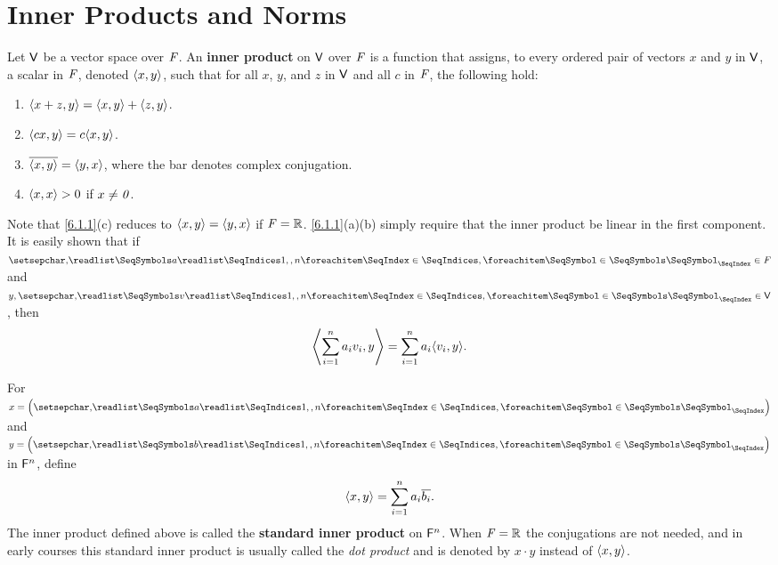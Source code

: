 \section{Inner Products and Norms}\label{sec:6.1}

\begin{defn}\label{6.1.1}
  Let \(\mathsf{V}\) be a vector space over \(\mathit{F}\).
  An \textbf{inner product} on \(\mathsf{V}\) over \(\mathit{F}\) is a function that assigns, to every ordered pair of vectors \(x\) and \(y\) in \(\mathsf{V}\), a scalar in \(\mathit{F}\), denoted \(\left\langle x, y\right\rangle\), such that for all \(x\), \(y\), and \(z\) in \(\mathsf{V}\) and all \(c\) in \(\mathit{F}\), the following hold:
  \begin{enumerate}
    \item \(\left\langle x + z, y\right\rangle = \left\langle x, y\right\rangle + \left\langle z, y\right\rangle\).
    \item \(\inn{cx, y} = c \inn{x, y}\).
    \item \(\overline{\left\langle x, y\right\rangle} = \left\langle y, x\right\rangle\), where the bar denotes complex conjugation.
    \item \(\left\langle x, x\right\rangle > 0\) if \(x \neq \mathit{0}\).
  \end{enumerate}
\end{defn}

\begin{note}
  Note that \cref{6.1.1}(c) reduces to \(\left\langle x, y\right\rangle = \left\langle y, x\right\rangle\) if \(\mathit{F} = \mathbb{R}\).
  \cref{6.1.1}(a)(b) simply require that the inner product be linear in the first component.
  It is easily shown that if \(\seq{a}{1,,n} \in \F\) and \(y, \seq{v}{1,,n} \in \V\), then
  \[
    \inn{\sum_{i = 1}^n a_i v_i, y} = \sum_{i = 1}^n a_i \inn{v_i, y}.
  \]
\end{note}

\begin{eg}\label{6.1.2}
  For \(x = \tuple{a}{1,,n}\) and \(y = \tuple{b}{1,,n}\) in \(\mathsf{F}^n\), define
  \[
    \left\langle x, y\right\rangle = \sum_{i = 1}^n a_i \overline{b_i}.
  \]
  The inner product defined above is called the \textbf{standard inner product} on \(\mathsf{F}^n\).
  When \(\mathit{F} = \mathbb{R}\) the conjugations are not needed, and in early courses this standard inner product is usually called the \emph{dot product} and is denoted by \(x \cdot y\) instead of \(\left\langle x, y\right\rangle\).
\end{eg}

